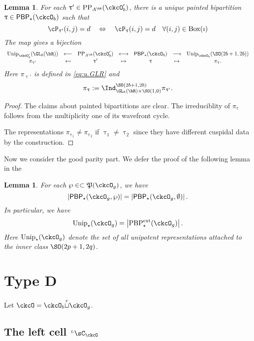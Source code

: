 \documentclass[12pt,a4paper]{amsart}
\def\abs#1{\left|{#1}\right|}
\numberwithin{equation}{section}
\newtheorem{lem}[thm]{Lemma}
\theoremstyle{remark}
\def\Unip{\mathrm{Unip}}
\def\PP{\mathrm{PP}}
\def\BOX#1{\mathrm{Box}(#1)}
\providecommand\mapsfrom{\scalebox{-1}[1]{$\mapsto$}}
\def\LC{{}^{\scriptscriptstyle L}\sC}
\def\cuprow{{\stackrel{r}{\sqcup}}}
\def\CPP{\mathfrak{P}}
\def\PBPes{\mathrm{PBP}^{\mathrm{ext}}_{\star}}
\def\PBP{\mathsf{PBP}}
\def\sP{\wp}
\begin{document}
\begin{lem}
  For each $\uptau' \in \PP_{A^{\bR}}(\ckcO'_{b})$, there is a unique painted
  bipartition $\uptau\in \PBP_{\star}(\ckcO_{b})$ such that
  \[
    \cP_{\uptau'}(i,j) = d \quad %
    \Leftrightarrow
    \quad
    \cP_{\uptau}(i,j) = d \quad \forall (i,j)\in \BOX{\imath}\\
  \]
  The map gives a bijection
  \[
    \begin{array}{ccccccc}
      \Unip_{\ckcO'_{b}}(\GL_{b}(\bR))&\longleftarrow
      &\PP_{A^{\bR}}(\ckcO'_{b}) & \longleftrightarrow
      & \PBP_{\star}(\ckcO_{b}) & \longrightarrow
      & \Unip_{\ckcO_{b}}(\SO(2b+1,2b))\\
      \pi_{\uptau'} & \mapsfrom & \uptau' & \mapsto
      & \uptau & \mapsto & \pi_{\uptau}.
    \end{array}
  \]
  Here $\pi_{\uptau'}$ is defined in \eqref{eq:u.GLR} and
  \[
    \pi_{\uptau} := \Ind_{\GL_{b}(\bR)\times \SO(1,0)}^{\SO(2b+1,2b)} \pi_{\uptau'}.
  \]
\end{lem}
\begin{proof}
  The claims about painted bipartitions are clear.
  The irreduciblity of $\pi_{\uptau}$ follows from the multiplicity one
  of its wavefront cycle.

  The representations $\pi_{\uptau_{1}}\neq \pi_{\uptau_{2}}$ if
  $\uptau_{1}\neq \uptau_{2}$ since they have different cuspidal data by the
  construction.
\end{proof}

Now we consider the good parity part. We defer the proof of the following lemma
in the 

\begin{lem}
  For each $\sP\in \subset \CPP(\ckcO_{g})$,
  we have
  \[
    \abs{\PBP_{\star}(\ckcO_{g},\sP)} =
    \abs{\PBP_{\star}(\ckcO_{g},\emptyset)}.
  \]
  In particular, we have
  \[
    \Unip_{\star}(\ckcO_{g}) = \abs{\PBPes(\ckcO_{g})}.
  \]
  Here $\Unip_{\star}(\ckcO_{g})$ denote the set of all unipotent
  representations attached to the inner class $\SO(2p+1,2q)$.
\end{lem}


\section{Type D}


Let $\ckcO = \ckcO_{b}\cuprow \ckcO_{g}$.

\subsection{The left cell $\LC_{\ckcO}$}
\end{document}
